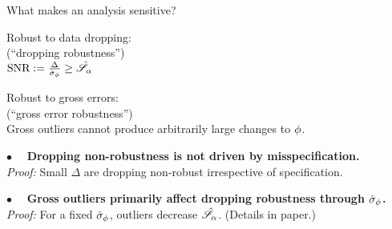 
\begin{frame}[t]{What makes an analysis sensitive?}
%
\begin{minipage}[t]{0.45\textwidth}
\begin{center}
    Robust to data dropping:\\
    (``dropping robustness'')\\
    \vspace{1em}
    $\textrm{SNR} := \frac{\Delta}{\hat\sigma_{\phi}} \ge \hat{\mathscr{S}}_\alpha$
\end{center}
\end{minipage}
%
\begin{minipage}[t]{0.45\textwidth}
\begin{center}
    Robust to gross errors:\\
    (``gross error robustness'')\\
    \vspace{1em}
    Gross outliers cannot produce
    arbitrarily large changes to $\phi$.
\end{center}
\end{minipage}

\vspace{1em}
\hrulefill

\pause
\vspace{1em} $\bullet\quad$
\textbf{Dropping non-robustness is not driven by misspecification.\\}
\textit{Proof: }
Small $\Delta$ are dropping non-robust irrespective of specification.

\pause
\vspace{1em} $\bullet\quad$
\textbf{Gross outliers primarily affect dropping robustness through $\hat\sigma_{\phi}$.\\}
\textit{Proof: }
For a fixed $\hat\sigma_{\phi}$, outliers decrease $\hat{\mathscr{S}}_\alpha$.
(Details in paper.)

\end{frame}





